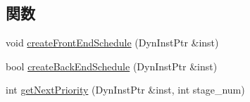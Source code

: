 \subsection*{関数}
\begin{DoxyCompactItemize}
\item 
void \hyperlink{namespaceThePipeline_a47c8cbd46bfdf2ebcec1d556e7bcea01}{createFrontEndSchedule} (DynInstPtr \&inst)
\item 
bool \hyperlink{namespaceThePipeline_abea63cbb0df7d307fa9c239e6fea49e5}{createBackEndSchedule} (DynInstPtr \&inst)
\item 
int \hyperlink{namespaceThePipeline_ac700a8f16a36e0276ea60791d35dbcc2}{getNextPriority} (DynInstPtr \&inst, int stage\_\-num)
\end{DoxyCompactItemize}
